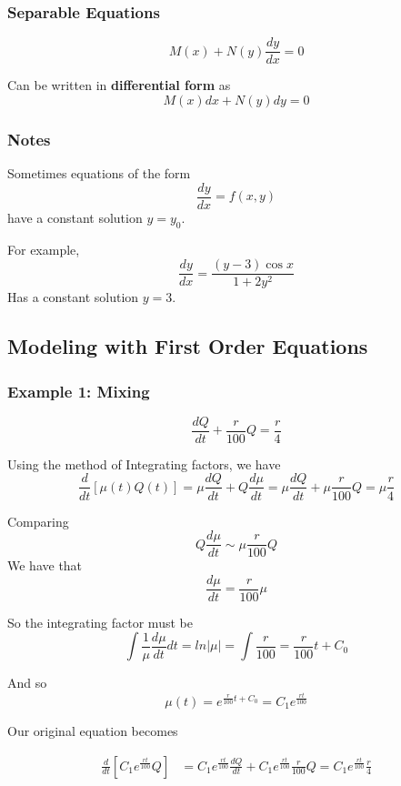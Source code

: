 \subsubsection{Separable Equations}

$$
M(x) + N(y) \frac{dy}{dx} = 0
$$

Can be written in \textbf{differential form} as
$$
M(x)dx + N(y)dy = 0
$$


\subsubsection{Notes}

Sometimes equations of the form
$$
\frac{dy}{dx} = f(x,y)
$$
have a constant solution $y = y_0$.

For example,
$$
\frac{dy}{dx} = \frac{(y-3) \cos{x}}{1+2y^2}
$$
Has a constant solution $y=3$.
\\





\subsection{Modeling with First Order Equations}


\subsubsection{Example 1: Mixing}
$$
\frac{d Q}{dt} + \frac{r}{100}Q = \frac{r}{4}
$$

Using the method of Integrating factors, we have
$$
\frac{d}{dt}\left[\mu(t)Q(t)\right] = \mu\frac{dQ}{dt} + Q \frac{d\mu}{dt}
= \mu \frac{d Q}{dt} + \mu \frac{r}{100}Q = \mu \frac{r}{4}
$$

Comparing
$$
Q \frac{d\mu}{dt} \sim \mu \frac{r}{100}Q
$$
We have that
$$
\frac{d\mu}{dt} = \frac{r}{100} \mu
$$

So the integrating factor must be
$$
\int \frac{1}{\mu} \frac{d\mu}{dt} dt = ln |\mu| 
= \int \frac{r}{100} = \frac{r}{100}t + C_0
$$

And so
$$
\mu(t) = e^{\frac{r}{100}t + C_0} = C_1e^{\frac{rt}{100}}
$$

Our original equation becomes

\begin{align*}
    \frac{d}{dt} \left[ C_1e^{\frac{rt}{100}} Q \right]  &=   
    C_1e^{\frac{rt}{100}} \frac{d Q}{dt} + C_1e^{\frac{rt}{100}} \frac{r}{100}Q = C_1e^{\frac{rt}{100}} \frac{r}{4}
\end{align*}

